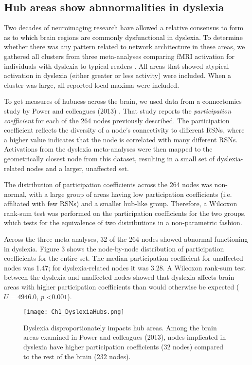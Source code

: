 \subsection{Hub areas show abnnormalities in dyslexia}
Two decades of neuroimaging research have allowed a relative consensus to form as to which brain regions are commonly dysfunctional in dyslexia. To determine whether there was any pattern related to network architecture in these areas, we gathered all clusters from three meta-analyses comparing fMRI activation for individuals with dyslexia to typical readers \cite{Maisog2008, Richlan2009, Paulesu2014}. All areas that showed atypical activation in dyslexia (either greater or less activity) were included. When a cluster was large, all reported local maxima were included. 

To get measures of hubness across the brain, we used data from a connectomics study by Power and colleagues (2013) \cite{Power2013}. That study reports the \textit{participation coefficient} for each of the 264 nodes previously described. The participation coefficient reflects the diversity of a node's connectivity to different RSNs, where a higher value indicates that the node is correlated with many different RSNs. Activations from the dyslexia meta-analyses were then mapped to the geometrically closest node from this dataset, resulting in a small set of dyslexia-related nodes and a larger, unaffected set.

The distribution of participation coefficients across the 264 nodes was non-normal, with a large group of areas having low participation coefficients (i.e. affiliated with few RSNs) and a smaller hub-like group. Therefore, a Wilcoxon rank-sum test was performed on the participation coefficients for the two groups, which tests for the equivalence of two distributions in a non-parametric fashion.

Across the three meta-analyses, 32 of the 264 nodes showed abnormal functioning in dyslexia. Figure 3 shows the node-by-node distribution of participation coefficients for the entire set. The median participation coefficient for unaffected nodes was 1.47; for dyslexia-related nodes it was 3.28. A Wilcoxon rank-sum test between the dyslexia and unaffected nodes showed that dyslexia affects brain areas with higher participation coefficients than would otherwise be expected ($U = 4946.0$, $p$ \textless $0.001$). 

\begin{figure}[h!]
\centering
\texttt{[image: Ch1\_DyslexiaHubs.png]}
    \caption[Dyslexia disproportionately impacts hub areas.]{Dyslexia disproportionately impacts hub areas. Among the brain areas examined in Power and colleagues (2013), nodes implicated in dyslexia have higher participation coefficients (32 nodes) compared to the rest of the brain (232 nodes).}
\label{fig:texlogo}
\end{figure}


